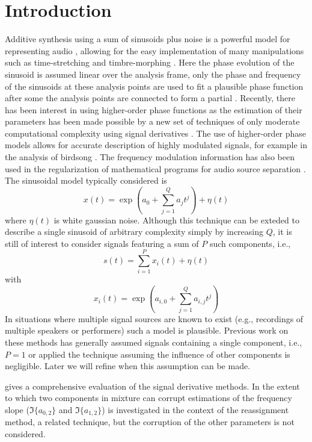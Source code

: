 \documentclass[twoside,a4paper]{article}
\begin{document}
\section{Introduction}
\label{sec:intro}
Additive synthesis using a sum of sinusoids plus noise is a powerful model for
representing audio \cite{serra1989system}, allowing for the easy implementation
of many manipulations such as time-stretching \cite{marchand2004enhanced} and
timbre-morphing \cite{haken2007beyond}.
%
Here the phase evolution of the sinusoid is assumed linear over
the analysis frame, only the phase and frequency of the sinusoids at these
analysis points are used to fit a plausible phase function after some
the analysis points are connected to form a partial
\cite{mcaulay1986speech}. 
%
Recently, there has
been interest in using higher-order phase functions \cite{xuepiecewise} as the estimation of
their parameters has been made possible by a new set of techniques of only
moderate computational complexity using signal derivatives \cite{hamilton2011non}.
%
The use
of higher-order phase models allows for accurate description of highly modulated
signals, for
example in the analysis of birdsong \cite{stowell2013improved}.
%
The frequency
modulation information has also been used in the
regularization of mathematical programs for audio source separation \cite{creager2016musicalsource}.
%
The sinusoidal model typically considered is
%
\begin{equation}
    \label{eq:polyphaseexp}
    x(t) = \exp(a_0 + \sum_{j=1}^{Q} a_j t^j) + \eta(t)
\end{equation}
where $\eta(t)$ is white gaussian noise.
%
Although this technique can be exteded to describe a single
sinusoid of arbitrary complexity simply by increasing $Q$, it is still of
interest to consider signals featuring a sum of $P$ such components, i.e.,
%
\begin{equation}
    \label{eq:polyphaseexpmix}
    s(t) = \sum_{i=1}^{P} x_{i}(t) + \eta(t)
\end{equation}
%
with
%
\[
    x_{i}(t) = \exp(a_{i,0} + \sum_{j=1}^{Q} a_{i,j} t^j)
\]
%
In situations where multiple signal sources are known to exist (e.g., recordings
of multiple speakers or performers) such a model is plausible.
%
Previous work on these methods has generally assumed signals containing a single
component, i.e., $P=1$ or applied the technique assuming the influence of other
components is negligible. Later we will refine when this assumption can be made.

\cite{hamilton2012comparisons} gives a comprehensive evaluation of the signal
derivative methods. In \cite{robel2002estimating} the extent to which two
components in mixture can corrupt estimations of the frequency slope
($\Im\{a_{0,2}\}$ and $\Im\{a_{1,2}\}$) is investigated in the context of the
reassignment method, a related technique, but the corruption of the other
parameters is not considered.
\end{document}
